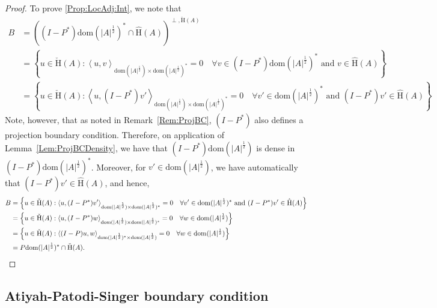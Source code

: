 \documentclass[a4paper,10pt,reqno]{amsart}
\newcommand{\dbrac}[1]{\left\{#1\right\}}
\newcommand{\modulus}[1]{|#1|}
\newcommand{\set}[1]{\dbrac{#1}}
\newcommand{\checkH}{\check{\mathrm{H}}}
\newcommand{\hatH}{\hat{\mathrm{H}}}
\newcommand{\dom}{\mathrm{dom}}
\newcommand{\inprod}[1]{\left\langle #1 \right\rangle}%
\theoremstyle{definition}
\begin{document}
\begin{proof}
To prove \ref{Prop:LocAdj:Int}, we note that
\begin{align*}
B & = ((I - P^\ast)\dom(\modulus{A}^{\frac12})^\ast \cap \hatH(A))^{\perp, \checkH(A)}                                                                                                                                               \\
  & = \set{u \in \checkH(A): \inprod{u, v}_{\dom(\modulus{A}^{\frac12})\times \dom(\modulus{A}^{\frac12})^\ast } = 0 \quad \forall v \in (I - P^\ast)\dom(\modulus{A}^{\frac12})^\ast \text{ and } v \in \hatH(A)}                  \\
  & =  \set{u \in \checkH(A): \inprod{u, (I - P^\ast) v'}_{\dom(\modulus{A}^{\frac12})\times \dom(\modulus{A}^{\frac12})^\ast } = 0 \quad \forall v' \in \dom(\modulus{A}^{\frac12})^\ast \text{ and } (I - P^\ast)v' \in \hatH(A)}
\end{align*}
Note, however, that as noted in Remark~\ref{Rem:ProjBC}, $(I - P^\ast)$ also defines a projection boundary condition.
Therefore, on application of Lemma~\ref{Lem:ProjBCDensity}, we have that  $(I - P^\ast) \dom(\modulus{A}^{\frac12})$ is dense in $(I - P^\ast) \dom(\modulus{A}^{\frac12})^\ast$.
Moreover, for $v' \in \dom(\modulus{A}^{\frac12})$, we have automatically that $(I - P^\ast)v' \in \hatH(A)$, and hence,
\begin{align*}
B & = \set{u \in \checkH(A): \inprod{u, (I - P^\ast) v'}_{\dom(\modulus{A}^{\frac12})\times \dom(\modulus{A}^{\frac12})^\ast } = 0 \quad \forall v' \in \dom(\modulus{A}^{\frac12})^\ast \text{ and } (I - P^\ast)v' \in \hatH(A)} \\
  & =\set{u \in \checkH(A): \inprod{u, (I - P^\ast)w}_{\dom(\modulus{A}^{\frac12})\times \dom(\modulus{A}^{\frac12})^\ast } = 0 \quad \forall w \in \dom(\modulus{A}^{\frac12})}                                                   \\
  & =\set{u \in \checkH(A): \inprod{(I - P)u, w}_{\dom(\modulus{A}^{\frac12})^\ast \times \dom(\modulus{A}^{\frac12})} = 0 \quad \forall w \in \dom(\modulus{A}^{\frac12})}                                                        \\
  & = P \dom(\modulus{A}^{\frac12})^\ast \cap \checkH(A).
\qedhere
\end{align*}
\end{proof}


\subsection{Atiyah-Patodi-Singer boundary condition}
\label{sec:APS}
\end{document}
